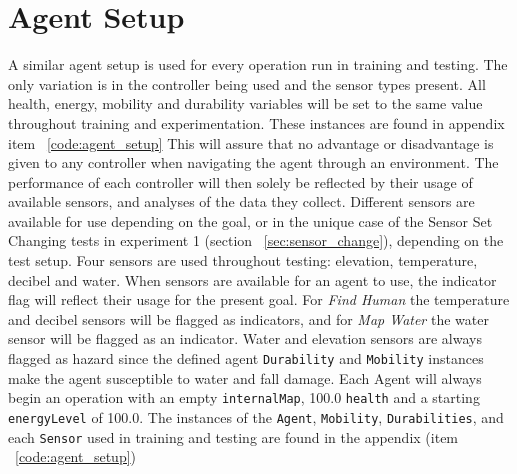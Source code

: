 \section{Agent Setup} \label{sec:agent_setups}
A similar agent setup is used for every operation run in training and testing.
The only variation is in the controller being used and the sensor types present.
All health, energy, mobility and durability variables will be set to the same value throughout training and experimentation.
These instances are found in appendix item ~\ref{code:agent_setup}
This will assure that no advantage or disadvantage is given to any controller when navigating the agent through an environment.
The performance of each controller will then solely be reflected by their usage of available sensors, and analyses of the data they collect.
Different sensors are available for use depending on the goal, or in the unique case of the Sensor Set Changing tests in experiment 1 (section ~\ref{sec:sensor_change}), depending on the test setup.
Four sensors are used throughout testing: elevation, temperature, decibel and water.
When sensors are available for an agent to use, the indicator flag will reflect their usage for the present goal.
For \textit{Find Human} the temperature and decibel sensors will be flagged as indicators, and for \textit{Map Water} the water sensor will be flagged as an indicator.
Water and elevation sensors are always flagged as hazard since the defined agent \texttt{Durability} and \texttt{Mobility} instances make the agent susceptible to water and fall damage.
Each Agent will always begin an operation with an empty \texttt{internalMap}, 100.0 \texttt{health} and a starting \texttt{energyLevel} of 100.0.
The instances of the \texttt{Agent}, \texttt{Mobility}, \texttt{Durabilities}, and each \texttt{Sensor} used in training and testing are found in the appendix (item ~\ref{code:agent_setup})


